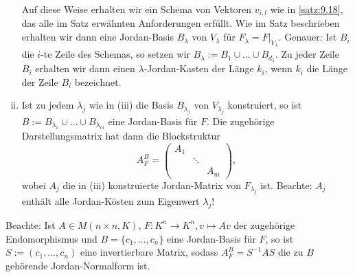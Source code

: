\begin{bemerkung}
\begin{enumerate}[(i)]
		Auf diese Weise erhalten wir ein Schema von Vektoren $v_{i,l}$ wie in \autoref{satz:9.18}, das alle im Satz erwähnten Anforderungen erfüllt.
		Wie im Satz beschrieben erhalten wir dann eine Jordan-Basis $B_\lambda$ von $V_\lambda$ für $F_\lambda = F \big|_{V_\lambda}$.
		Genauer: Ist $B_i$ die $i$-te Zeile des Schemas, so setzen wir $B_\lambda := B_1 \cup \dots \cup B_{d_1}$.
		Zu jeder Zeile $B_i$ erhalten wir dann einen $\lambda$-Jordan-Kasten der Länge $k_i$, wenn $k_i$ die Länge der Zeile $B_i$ bezeichnet.
		\item Ist zu jedem $\lambda_j$ wie in (iii) die Basis $B_{\lambda_j}$ von $V_{\lambda_j}$ konstruiert, so ist $B:= B_{\lambda_1} \cup \dots \cup B_{\lambda_m}$ eine Jordan-Basis für $F$.
		Die zugehörige Darstellungsmatrix hat dann die Blockstruktur
		\[
			A_F^B = \begin{pmatrix}
			A_1 & & \\
			& \ddots & \\
			& & A_m
			\end{pmatrix},
		\]
		wobei $A_j$ die in (iii) konstruierte Jordan-Matrix von $F_{\lambda_j}$ ist.
		Beachte: $A_j$ enthält alle Jordan-Kösten zum Eigenwert $\lambda_j$!
	\end{enumerate}
\end{bemerkung}

Beachte: Ist $A \in M(n \times n,K)$, $F \colon K^n \rightarrow K^n, v \mapsto Av$ der zugehörige Endomorphismus und $B = \{c_1,\dots,c_n\}$ eine Jordan-Basis für $F$, so ist $S := (c_1,\dots,c_n)$ eine invertierbare Matrix, sodass $A_F^B = S^{-1}AS$ die zu $B$ gehörende Jordan-Normalform ist.

